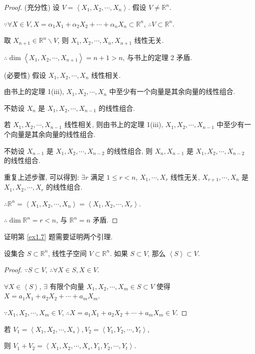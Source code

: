 \documentclass[color=black,device=normal,lang=cn,mode=geye]{elegantnote}
\begin{document}
\begin{proof}
    (充分性) 设 $V=\left<X_1,X_2,\cdots,X_n\right>$. 假设 $V\neq\mathbb{R}^n$.

    $\because\forall X\in V,X=\alpha_1X_1+\alpha_2X_2+\cdots+\alpha_nX_n\subset\mathbb{R}^n$, $\therefore V\subset\mathbb{R}^n$.

    取 $X_{n+1}\in\mathbb{R}^n\backslash V$, 则 $X_1,X_2,\cdots,X_n,X_{n+1}$ 线性无关.

    $\therefore\dim\left<X_1,X_2,\cdots,X_{n+1}\right>=n+1>n$, 与书上的定理 2 矛盾.

    (必要性) 假设 $X_1,X_2,\cdots,X_n$ 线性相关.

    由书上的定理 1(iii), $X_1,X_2,\cdots,X_n$ 中至少有一个向量是其余向量的线性组合.
    
    不妨设 $X_n$ 是 $X_1,X_2,\cdots,X_{n-1}$ 的线性组合.

    若 $X_1,X_2,\cdots,X_{n-1}$ 线性相关, 则由书上的定理 1(iii), $X_1,X_2,\cdots,X_{n-1}$ 中至少有一个向量是其余向量的线性组合.

    不妨设 $X_{n-1}$ 是 $X_1,X_2,\cdots,X_{n-2}$ 的线性组合, 则 $X_n,X_{n-1}$ 是 $X_1,X_2,\cdots,X_{n-2}$ 的线性组合.

    重复上述步骤, 可以得到: $\exists r$ 满足 $1\leq r<n$, $X_1,\cdots,X_r$ 线性无关, $X_{r+1},\cdots,X_n$ 是 $X_1,X_2,\cdots,X_r$ 的线性组合.

    $\therefore\mathbb{R}^n=\left<X_1,X_2,\cdots,X_n\right>=\left<X_1,X_2,\cdots,X_r\right>$.

    $\therefore\dim\mathbb{R}^n=r<n$, 与 $\mathbb{R}^n=n$ 矛盾.
\end{proof}
证明第 \ref{ex1.7} 题需要证明两个引理.
\begin{lemma}\label{l2.1}
    设集合 $S\subset\mathbb{R}^n$, 线性子空间 $V\subset\mathbb{R}^n$. 如果 $S\subset V$, 那么 $\left<S\right>\subset V$.
\end{lemma}
\begin{proof}
    $\because S\subset V$, $\therefore\forall X\in S,X\in V$.

    $\forall X\in\left<S\right>$, $\exists$ 有限个向量 $X_1,X_2,\cdots,X_m\in S\subset V$ 使得 $X=a_1X_1+a_2X_2+\cdots+a_mX_m$.

    $\because X_1,X_2,\cdots,X_m\in V$, $\therefore X=a_1X_1+a_2X_2+\cdots+a_mX_m\in V$.
\end{proof}
\begin{lemma}\label{l2.2}
    若 $V_1=\left<X_1,X_2,\cdots,X_s\right>,V_2=\left<Y_1,Y_2,\cdots,Y_t\right>$,
    
    则 $V_1+V_2=\left<X_1,X_2,\cdots,X_s,Y_1,Y_2,\cdots,Y_t\right>$.
\end{lemma}
\end{document}
